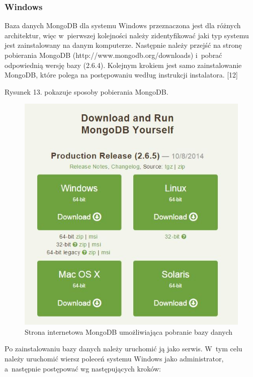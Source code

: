\documentclass[8pt,a4paper,notitlepage]{article}
\begin{document}
\subsubsection{Windows}
Baza danych MongoDB dla systemu Windows przeznaczona jest dla różnych architektur, więc w~pierwszej kolejności należy zidentyfikować jaki typ systemu jest zainstalowany na danym komputerze. Następnie należy przejść na stronę pobierania MongoDB (http://www.mongodb.org/downloads) i~pobrać odpowiednią wersję bazy (2.6.4). Kolejnym krokiem jest samo zainstalowanie MongoDB, które polega na postępowaniu według instrukcji instalatora. [12]
\par Rysunek 13. pokazuje sposoby pobierania MongoDB.
\begin{figure}[H]
    \centering
    \includegraphics[width=\linewidth]{obrazy/mongoWdr}
    \caption{Strona internetowa MongoDB umożliwiająca pobranie bazy danych}
\end{figure} 
Po zainstalowaniu bazy danych należy uruchomić ją jako serwis. W~tym celu należy uruchomić wiersz poleceń systemu Windows jako administrator, a~następnie postępować wg następujących kroków: \\
\end{document}
